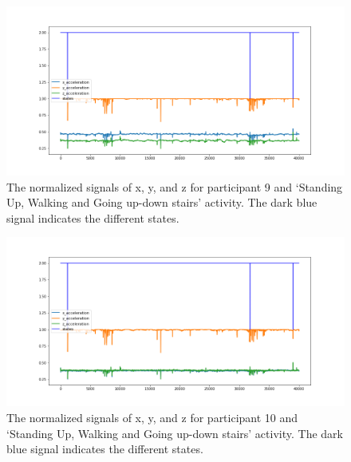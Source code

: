 \begin{figure}[H]
    \centering
    \begin{minipage}[b]{1\textwidth}
        \includegraphics[width=\textwidth]{manuscript/src/figures/Ass3/Ass3_Q2_states_user_8N.png}
    \end{minipage}
    \caption{The normalized signals of x, y, and z for participant 9 and ‘Standing  Up,  Walking  and  Going  up-down  stairs’ activity. The dark blue signal indicates the different states.}
    \label{fig:Ass3_Q2_states_user_8N}
\end{figure}
\begin{figure}[H]
    \centering
    \begin{minipage}[b]{1\textwidth}
        \includegraphics[width=\textwidth]{manuscript/src/figures/Ass3/Ass3_Q2_states_user_9N.png}
    \end{minipage}
    \caption{The normalized signals of x, y, and z for participant 10 and ‘Standing  Up,  Walking  and  Going  up-down  stairs’ activity. The dark blue signal indicates the different states.}
    \label{fig:Ass3_Q2_states_user_9N}
\end{figure}
